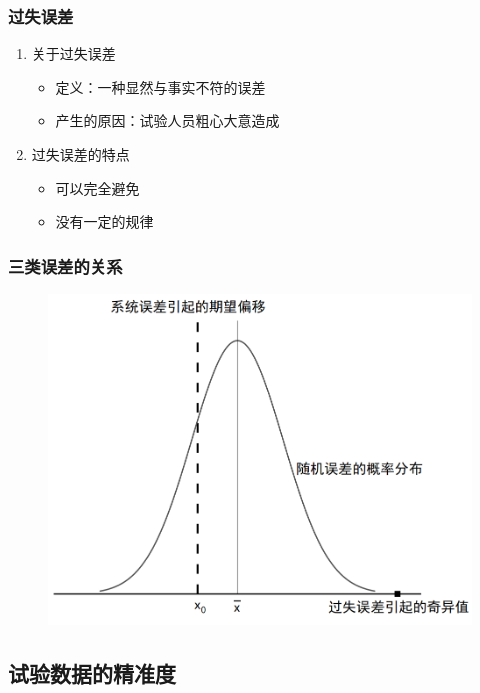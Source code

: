 \documentclass[UTF8]{ctexart}
\begin{document}
\subsubsection{过失误差}
\begin{enumerate}[•]
  \item 关于过失误差
    \begin{itemize}
    \item 定义：一种显然与事实不符的误差
    \item 产生的原因：试验人员粗心大意造成
    \end{itemize} 
  \item 过失误差的特点
    \begin{itemize}
    \item 可以完全避免
    \item 没有一定的规律
   \end{itemize} 
\end{enumerate}

\subsubsection{三类误差的关系}
\begin{figure}[H]
  \begin{center}
  \includegraphics[height=20\baselineskip]{FIG/N3.png}
  \end{center}
  \end{figure}


\subsection{试验数据的精准度}
\end{document}
